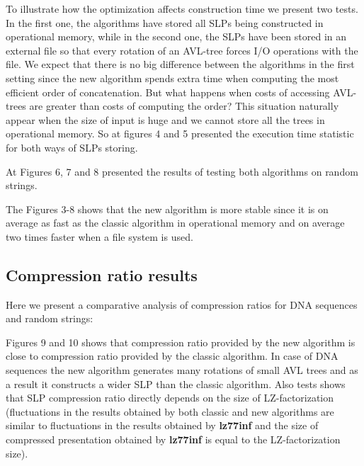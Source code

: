 ﻿\documentclass[10pt, conference, compsocconf]{IEEEtran}
\begin{document}
\DNASpeedTestInFile

To illustrate how the optimization affects  construction time we present two
tests. In the first one, the algorithms have stored all SLPs being constructed
in operational memory, while in the second one, the SLPs have been stored in an
external file so that every rotation of an AVL-tree forces I/O operations with
the file. We expect that there is no big difference between the algorithms in
the first setting since the new algorithm spends extra time when computing the
most efficient order of concatenation. But what happens when costs of accessing
AVL-trees are greater than costs of computing the order? This situation
naturally appear when the size of input is huge and we cannot store all the
trees in operational memory. So at figures 4 and 5 presented the execution time statistic for both ways of SLPs
storing.

\RandomRotations

\RandomSpeedTestInMemory

\RandomSpeedTestInFile

At Figures 6, 7 and 8 presented the results of testing both algorithms on random strings. 

The Figures 3-8 shows that the new algorithm is more stable since it is on
average as fast as the classic algorithm in operational memory and on average
two times faster when a file system is used.

\subsection{Compression ratio results}

Here we present a comparative analysis of compression ratios for DNA sequences
and random strings:

Figures 9 and 10 shows that compression ratio provided by the new algorithm is
close to compression ratio provided by the classic algorithm. In case of DNA
sequences the new algorithm generates many rotations of small AVL trees and as
a result it constructs a wider SLP than the classic algorithm. Also tests shows
that SLP compression ratio directly depends on the size of LZ-factorization
(fluctuations in the results obtained by both classic and new algorithms are
similar to fluctuations in the results obtained by \textbf{lz77inf} and the
size of compressed presentation obtained by \textbf{lz77inf} is equal to the
LZ-factorization size).

\DNACompression
\end{document}

